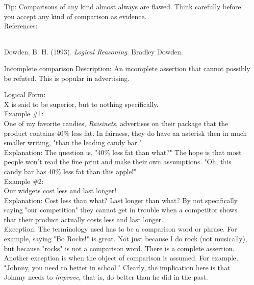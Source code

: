 \documentclass[a4paper,12pt,single,pdftex]{scrbook}
\begin{document}
    
      Tip: Comparisons of any kind almost always are flawed.  Think carefully before you accept any kind of comparison as evidence.
    \\

    References:

    
      
        
      \\

      
        
          Dowden, B. H. (1993). {\it Logical Reasoning}. Bradley Dowden.
        
      
    
  

Incomplete comparison
    Description: An incomplete assertion that cannot possibly be refuted. This is popular in advertising.

    
      Logical Form:
    \\

    
      X is said to be superior, but to nothing specifically.
    \\

    
      Example \#1:
    \\

    
      One of my favorite candies, {\it Raisinets}, advertises on their package that the product contains 40\% less fat. In fairness, they do have an asterisk then in much smaller writing, "than the leading candy bar."
    \\

    
      Explanation: The question is, "40\% less fat than what?" The hope is that most people won't read the fine print and make their own assumptions. "Oh, this candy bar has 40\% less fat than this apple!"
    \\

    
      Example \#2:
    \\

    
      Our widgets cost less and last longer!
    \\

    
      Explanation: Cost less than what? Last longer than what? By not specifically saying "our competition" they cannot get in trouble when a competitor shows that their product actually costs less and last longer.
    \\

    
      Exception: The terminology used has to be a comparison word or phrase. For example, saying "Bo Rocks!" is great. Not just because I do rock (not musically), but because "rocks" is not a comparison word. There is a complete assertion. Another exception is when the object of comparison is assumed. For example, "Johnny, you need to better in school." Clearly, the implication here is that Johnny needs to {\it improve}, that is, do better than he did in the past.
    \\
\end{document}
